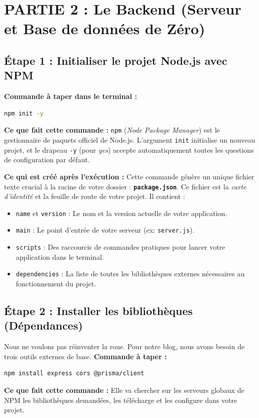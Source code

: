 \section{PARTIE 2 : Le Backend (Serveur et Base de données de Zéro)}

\subsection{Étape 1 : Initialiser le projet Node.js avec NPM}
\textbf{Commande à taper dans le terminal :}
\begin{lstlisting}[language=bash]
npm init -y
\end{lstlisting}
\textbf{Ce que fait cette commande :}
\texttt{npm} (\textit{Node Package Manager}) est le gestionnaire de paquets officiel de Node.js. L'argument \texttt{init} initialise un nouveau projet, et le drapeau \texttt{-y} (pour \textit{yes}) accepte automatiquement toutes les questions de configuration par défaut.

\textbf{Ce qui est créé après l'exécution :}
Cette commande génère un unique fichier texte crucial à la racine de votre dossier : \textbf{\texttt{package.json}}.
Ce fichier est la \textit{carte d'identité} et la feuille de route de votre projet. Il contient :
\begin{itemize}
    \item \texttt{name} et \texttt{version} : Le nom et la version actuelle de votre application.
    \item \texttt{main} : Le point d'entrée de votre serveur (ex: \texttt{server.js}).
    \item \texttt{scripts} : Des raccourcis de commandes pratiques pour lancer votre application dans le terminal.
    \item \texttt{dependencies} : La liste de toutes les bibliothèques externes nécessaires au fonctionnement du projet.
\end{itemize}

\subsection{Étape 2 : Installer les bibliothèques (Dépendances)}
Nous ne voulons pas réinventer la roue. Pour notre blog, nous avons besoin de trois outils externes de base.
\textbf{Commande à taper :}
\begin{lstlisting}[language=bash]
npm install express cors @prisma/client
\end{lstlisting}
\textbf{Ce que fait cette commande :}
Elle va chercher sur les serveurs globaux de NPM les bibliothèques demandées, les télécharge et les configure dans votre projet.

